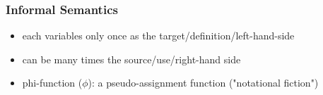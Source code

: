 \begin{frame}
\frametitle{Informal Semantics}
\begin{itemize}
\item each variables only once as the target/definition/left-hand-side
\item can be many times the source/use/right-hand side
\item phi-function ($\phi$): a pseudo-assignment function ("notational fiction")
\end{itemize}

\end{frame}
